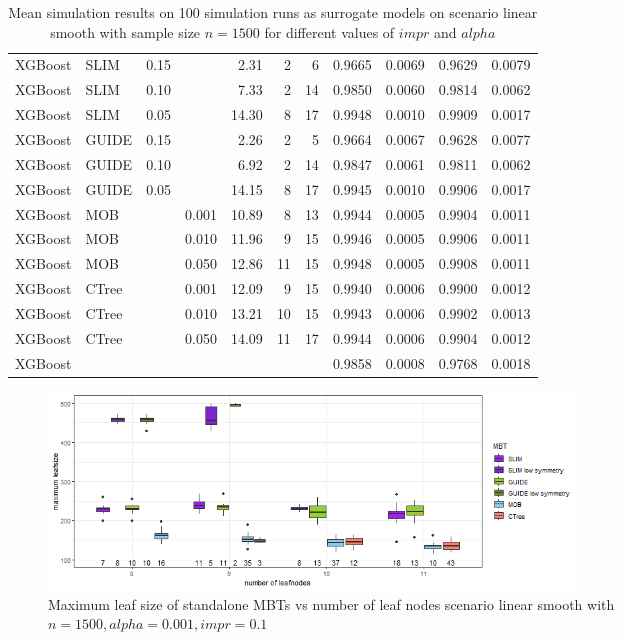 \begin{table}[!htb]
\begin{tabular}[t]{l|l|r|r|r|r|r|r|r|r|r}
XGBoost & SLIM & 0.15 & & 2.31 & 2 & 6 & 0.9665 & 0.0069 & 0.9629 & 0.0079\\
XGBoost & SLIM & 0.10 & & 7.33 & 2 & 14 & 0.9850 & 0.0060 & 0.9814 & 0.0062\\
XGBoost & SLIM & 0.05 & & 14.30 & 8 & 17 & 0.9948 & 0.0010 & 0.9909 & 0.0017\\
XGBoost & GUIDE & 0.15 & & 2.26 & 2 & 5 & 0.9664 & 0.0067 & 0.9628 & 0.0077\\
XGBoost & GUIDE & 0.10 & & 6.92 & 2 & 14 & 0.9847 & 0.0061 & 0.9811 & 0.0062\\
XGBoost & GUIDE & 0.05 & & 14.15 & 8 & 17 & 0.9945 & 0.0010 & 0.9906 & 0.0017\\
XGBoost & MOB & & 0.001 & 10.89 & 8 & 13 & 0.9944 & 0.0005 & 0.9904 & 0.0011\\
XGBoost & MOB & & 0.010 & 11.96 & 9 & 15 & 0.9946 & 0.0005 & 0.9906 & 0.0011\\
XGBoost & MOB & & 0.050 & 12.86 & 11 & 15 & 0.9948 & 0.0005 & 0.9908 & 0.0011\\
XGBoost & CTree & & 0.001 & 12.09 & 9 & 15 & 0.9940 & 0.0006 & 0.9900 & 0.0012\\
XGBoost & CTree & & 0.010 & 13.21 & 10 & 15 & 0.9943 & 0.0006 & 0.9902 & 0.0013\\
XGBoost & CTree & & 0.050 & 14.09 & 11 & 17 & 0.9944 & 0.0006 & 0.9904 & 0.0012\\
\hline
XGBoost &  & & &  &  &  & 0.9858 & 0.0008 & 0.9768 & 0.0018\\
\hline
\end{tabular}
\caption{Mean simulation results on 100 simulation runs as surrogate models on scenario linear smooth with sample size $n = 1500$ for different values of $impr$ and $alpha$}
\label{tab:app_linear_smooth_1000}
\end{table}


\begin{figure}[!htb]
     \centering
    \includegraphics[width=14cm]{Figures/simulations/chapter_5_simulation_study/basic_scenarios/linear_smooth/ls_1000_standalone_symmetrie.png}
    \caption{Maximum leaf size of standalone MBTs vs number of leaf nodes scenario linear smooth with $n=1500, alpha = 0.001, impr = 0.1$}
\label{fig:app_ls_1000_standalone_symmetrie}
\end{figure} 


